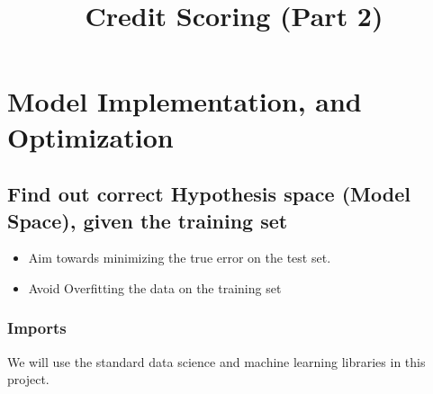 \documentclass[11pt]{article}
\title{Credit Scoring (Part 2)}
\providecommand{\tightlist}{%
      \setlength{\itemsep}{0pt}\setlength{\parskip}{0pt}}
\begin{document}
    
    
    \maketitle
    
    

    
    \section{Model Implementation, and
Optimization}\label{model-implementation-and-optimization}

\subsection{Find out correct Hypothesis space (Model Space), given the
training
set}\label{find-out-correct-hypothesis-space-model-space-given-the-training-set}

\begin{itemize}
\tightlist
\item
  Aim towards minimizing the true error on the test set.
\item
  Avoid Overfitting the data on the training set
\end{itemize}

    \subsubsection{Imports}\label{imports}

We will use the standard data science and machine learning libraries in
this project.
\end{document}
